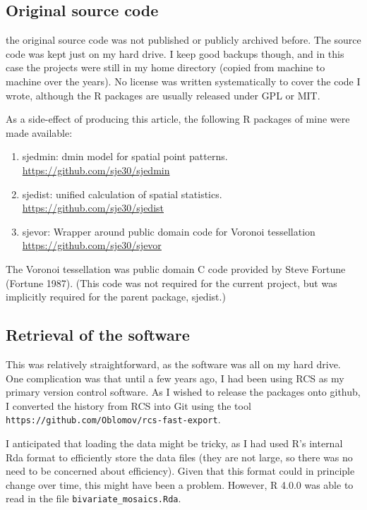 \hypertarget{original-source-code}{%
\subsection{Original source code}\label{original-source-code}}

the original source code was not published or publicly archived before.
The source code was kept just on my hard drive. I keep good backups
though, and in this case the projects were still in my home directory
(copied from machine to machine over the years). No license was written
systematically to cover the code I wrote, although the R packages are
usually released under GPL or MIT.

As a side-effect of producing this article, the following R packages of
mine were made available:

\begin{enumerate}
\def\labelenumi{\arabic{enumi}.}
\tightlist
\item
  sjedmin: dmin model for spatial point patterns.
  \url{https://github.com/sje30/sjedmin}
\item
  sjedist: unified calculation of spatial statistics.
  \url{https://github.com/sje30/sjedist}
\item
  sjevor: Wrapper around public domain code for Voronoi tessellation
  \url{https://github.com/sje30/sjevor}
\end{enumerate}

The Voronoi tessellation was public domain C code provided by Steve
Fortune (Fortune 1987). (This code was not required for the current
project, but was implicitly required for the parent package, sjedist.)

\hypertarget{retrieval-of-the-software}{%
\subsection{Retrieval of the software}\label{retrieval-of-the-software}}

This was relatively straightforward, as the software was all on my hard
drive. One complication was that until a few years ago, I had been using
RCS as my primary version control software. As I wished to release the
packages onto github, I converted the history from RCS into Git using
the tool \texttt{https://github.com/Oblomov/rcs-fast-export}.

I anticipated that loading the data might be tricky, as I had used R's
internal Rda format to efficiently store the data files (they are not
large, so there was no need to be concerned about efficiency). Given
that this format could in principle change over time, this might have
been a problem. However, R 4.0.0 was able to read in the file
\texttt{bivariate\_mosaics.Rda}.

